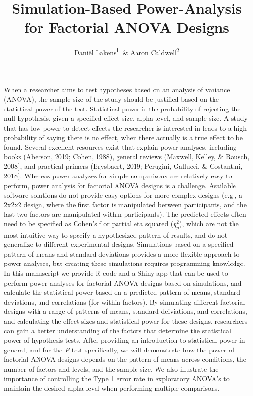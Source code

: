 \documentclass[,jou, draftfirst, a4paper,floatsintext]{apa6}
\title{Simulation-Based Power-Analysis for Factorial ANOVA Designs}
\author{Daniël Lakens\textsuperscript{1}~\& Aaron Caldwell\textsuperscript{2}}
\date{}
\affiliation{
\vspace{0.5cm}
\textsuperscript{1} Eindhoven University of Technology, The Netherlands\\\textsuperscript{2} Department of Health, Human Performance and Recreation, University of Arkansas, USA}
\begin{document}
\maketitle

When a researcher aims to test hypotheses based on an analysis of variance (ANOVA), the sample size of the study should be justified based on the statistical power of the test.
Statistical power is the probability of rejecting the null-hypothesis, given a specified effect size, alpha level, and sample size.
A study that has low power to detect effects the researcher is interested in leads to a high probability of saying there is no effect, when there actually is a true effect to be found.
Several excellent resources exist that explain power analyses, including books (Aberson, 2019; Cohen, 1988), general reviews (Maxwell, Kelley, \& Rausch, 2008), and practical primers (Brysbaert, 2019; Perugini, Gallucci, \& Costantini, 2018).
Whereas power analyses for simple comparisons are relatively easy to perform, power analysis for factorial ANOVA designs is a challenge.
Available software solutions do not provide easy options for more complex designs (e.g., a 2x2x2 design, where the first factor is manipulated between participants, and the last two factors are manipulated within participants).
The predicted effects often need to be specified as Cohen's f or partial eta squared (\(\eta_p^2\)), which are not the most intuitive way to specify a hypothesized pattern of results, and do not generalize to different experimental designs.
Simulations based on a specified pattern of means and standard deviations provides a more flexible approach to power analyses, but creating these simulations requires programming knowledge.
In this manuscript we provide R code and a Shiny app that can be used to perform power analyses for factorial ANOVA designs based on simulations, and calculate the statistical power based on a predicted pattern of means, standard deviations, and correlations (for within factors).
By simulating different factorial designs with a range of patterns of means, standard deiviations, and correlations, and calculating the effect sizes and statistical power for these designs, researchers can gain a better understanding of the factors that determine the statistical power of hypothesis tests.
After providing an introduction to statistical power in general, and for the \emph{F}-test specifically, we will demonstrate how the power of factorial ANOVA designs depends on the pattern of means across conditions, the number of factors and levels, and the sample size.
We also illustrate the importance of controlling the Type 1 error rate in exploratory ANOVA's to maintain the desired alpha level when performing multiple comparisons.
\end{document}

